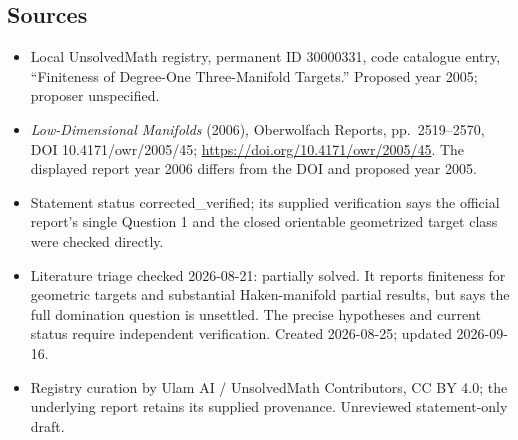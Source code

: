 \documentclass[11pt]{article}
\begin{document}
\subsection{Sources}
\begin{itemize}
\item Local UnsolvedMath registry, permanent ID 30000331, code catalogue entry, ``Finiteness of Degree-One Three-Manifold Targets.'' Proposed year 2005; proposer unspecified.
\item \emph{Low-Dimensional Manifolds} (2006), Oberwolfach Reports, pp.\ 2519--2570, DOI 10.4171/owr/2005/45; \url{https://doi.org/10.4171/owr/2005/45}. The displayed report year 2006 differs from the DOI and proposed year 2005.
\item Statement status corrected\_verified; its supplied verification says the official report's single Question 1 and the closed orientable geometrized target class were checked directly.
\item Literature triage checked 2026-08-21: partially solved. It reports finiteness for geometric targets and substantial Haken-manifold partial results, but says the full domination question is unsettled. The precise hypotheses and current status require independent verification. Created 2026-08-25; updated 2026-09-16.
\item Registry curation by Ulam AI / UnsolvedMath Contributors, CC BY 4.0; the underlying report retains its supplied provenance. Unreviewed statement-only draft.
\end{itemize}
\end{document}
